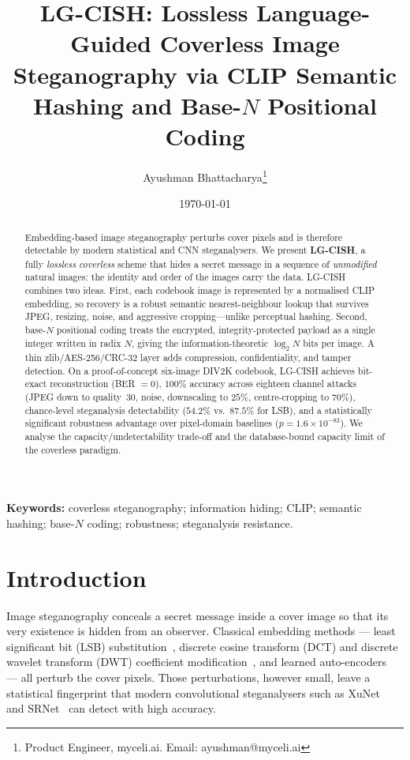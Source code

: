 \documentclass[10pt]{article}
\title{\textbf{LG-CISH: Lossless Language-Guided Coverless Image\\
Steganography via CLIP Semantic Hashing and Base-$N$ Positional Coding}}
\author{Ayushman Bhattacharya\thanks{Product Engineer, myceli.ai. Email: ayushman@myceli.ai}}
\date{\today}
\begin{document}
\maketitle

\begin{abstract}
\noindent
Embedding-based image steganography perturbs cover pixels and is therefore
detectable by modern statistical and CNN steganalysers. We present \textbf{LG-CISH},
a fully \emph{lossless} \emph{coverless} scheme that hides a secret message in a
sequence of \emph{unmodified} natural images: the identity and order of the images
carry the data. LG-CISH combines two ideas. First, each codebook image is
represented by a normalised CLIP embedding, so recovery is a robust semantic
nearest-neighbour lookup that survives JPEG, resizing, noise, and aggressive
cropping---unlike perceptual hashing. Second, base-$N$ positional coding treats
the encrypted, integrity-protected payload as a single integer written in radix
$N$, giving the information-theoretic $\log_2 N$ bits per image. A thin
zlib/AES-256/CRC-32 layer adds compression, confidentiality, and tamper
detection. On a proof-of-concept six-image DIV2K codebook, LG-CISH achieves
bit-exact reconstruction (BER $=0$), $100\%$ accuracy across eighteen channel
attacks (JPEG down to quality~30, noise, downscaling to $25\%$, centre-cropping to
$70\%$), chance-level steganalysis detectability ($54.2\%$ vs.\ $87.5\%$ for LSB),
and a statistically significant robustness advantage over pixel-domain baselines
($p=1.6\times10^{-83}$). We analyse the capacity/undetectability trade-off and the
database-bound capacity limit of the coverless paradigm.
\end{abstract}

\noindent\textbf{Keywords:} coverless steganography; information hiding; CLIP;
semantic hashing; base-$N$ coding; robustness; steganalysis resistance.

\section{Introduction}\label{sec:intro}
Image steganography conceals a secret message inside a cover image so that its
very existence is hidden from an observer. Classical embedding methods --- least
significant bit (LSB) substitution~\cite{chan2004,provos2003}, discrete cosine
transform (DCT) and discrete wavelet transform (DWT) coefficient
modification~\cite{westfeld2001f5}, and learned auto-encoders~\cite{baluja2017,tancik2020}
--- all perturb the cover pixels. Those perturbations, however small, leave a
statistical fingerprint that modern convolutional steganalysers such as
XuNet~\cite{xu2016} and SRNet~\cite{boroumand2019} can detect with high accuracy.
\end{document}
